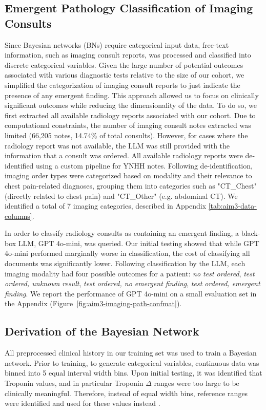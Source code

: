 \subsection{Emergent Pathology Classification of Imaging Consults}

Since Bayesian networks (BNs) require categorical input data, free-text information, such as imaging consult reports, was processed and classified into discrete categorical variables. Given the large number of potential outcomes associated with various diagnostic tests relative to the size of our cohort, we simplified the categorization of imaging consult reports to just indicate the presence of any emergent finding. This approach allowed us to focus on clinically significant outcomes while reducing the dimensionality of the data. To do so, we first extracted all available radiology reports associated with our cohort. Due to computational constraints, the number of imaging consult notes extracted was limited (66,205 notes, 14.74\% of total consults). However, for cases where the radiology report was not available, the LLM was still provided with the information that a consult was ordered. All available radiology reports were de-identified using a custom pipeline for YNHH notes. Following de-identification, imaging order types were categorized based on modality and their relevance to chest pain-related diagnoses, grouping them into categories such as "CT\_Chest" (directly related to chest pain) and "CT\_Other" (e.g. abdominal CT). We identified a total of 7 imaging categories, described in Appendix \ref{tab:aim3-data-
columns}.

In order to classify radiology consults as containing an emergent finding, a black-box LLM, GPT 4o-mini, was queried. Our initial testing showed that while GPT 4o-mini performed marginally worse in classification, the cost of classifying all documents was significantly lower. Following classification by the LLM, each imaging modality had four possible outcomes for a patient: \emph{no test ordered}, \emph{test ordered, unknown result}, \emph{test ordered, no emergent finding}, \emph{test ordered, emergent finding}. We report the performance of GPT 4o-mini on a small evaluation set in the Appendix (Figure~\ref{fig:aim3-imaging-path-confmat}). 

\subsection{Derivation of the Bayesian Network}

All preprocessed clinical history in our training set was used to train a Bayesian network. Prior to training, to generate categorical variables, continuous data was binned into 5 equal interval width bins. Upon initial testing, it was identified that Troponin values, and in particular Troponin $\Delta$ ranges were too large to be clinically meaningful. Therefore, instead of equal width bins, reference ranges were identified and used for these values instead \cite{americanboardofinternalmedicineLaboratoryreferenceranges2024, diercksDiagnosticAccuracyPointofcare2012, pirruccelloHSTroponinInterpretation, storrowAbsoluteRelativeChanges2015, vallabhajosyulaRoleAdmissionTroponinT2017}. 

